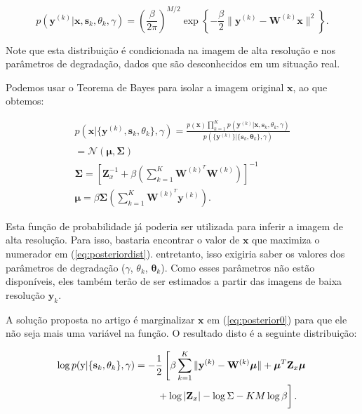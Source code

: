 \documentclass[12pt,openright,oneside,a4paper,english,brazil]{abntex2}
\begin{document}
\begin{equation}
	\label{eq:posterior0}
	p(\mathbf{y}^{(k)} | \mathbf{x}, \mathbf{s}_k, \theta_k, \gamma) = 
	\left(\frac{\beta}{2\pi}\right)^{M/2}
	\exp \left\{ -\frac{\beta}{2} \| \mathbf{y}^{(k)} - \mathbf{W}^{(k)} \mathbf{x} \|^2 \right\}.
\end{equation}

Note que esta distribuição é condicionada na imagem de alta resolução e nos parâmetros de degradação, dados que são desconhecidos em um situação real.

Podemos usar o Teorema de Bayes para isolar a imagem original $\mathbf{x}$, ao que obtemos:

\begin{gather}
	\label{eq:posteriordist}
	p(\mathbf{x}|\{\mathbf{y}^{(k)},\mathbf{s}_k,\theta_k\}, \gamma) = 
	\frac{p(\mathbf{x})\prod^K_{k=1} p(\mathbf{y}^{(k)}|\mathbf{x},\mathbf{s}_k,\theta_k, \gamma)}
	{p(\{\mathbf{y}^{(k)}\}|\{\mathbf{s}_k,\mathbf{\theta}_k\},\gamma)} \\
	= \mathcal{N}(\boldsymbol{\mu},\mathbf{\Sigma}) \\
	\mathbf{ \Sigma }= \left[\mathbf{Z}^{-1}_x + \beta \left( \sum^K_{k = 1} \mathbf{W}^{(k)^T} \mathbf{W}^{(k)} \right) \right]^{-1} \\
	\boldsymbol{\mu} = \beta \mathbf{ \Sigma } \left( \sum^K_{k=1} \mathbf{W}^{(k)^T}\mathbf{y}^{(k)} \right).
\end{gather}

Esta função de probabilidade já poderia ser utilizada para inferir a imagem de alta resolução.
Para isso, bastaria encontrar o valor de $\mathbf{x}$ que maximiza o numerador em (\ref{eq:posteriordist}). entretanto, isso exigiria saber os valores dos parâmetros de degradação ($\gamma$, $\theta_k$, $\mathbf{\theta}_k$).
Como esses parâmetros não estão disponíveis, eles também terão de ser estimados a partir das imagens de baixa resolução $\mathbf{y}_k$. 

A solução proposta no artigo é marginalizar $\mathbf{x}$ em (\ref{eq:posterior0}) para que ele não seja mais uma variável na função. O resultado disto é a seguinte distribuição:

\begin{align}
	\label{eq:parameter}
	\log p(\mathrm{y}|\{\mathbf{s}_k,\theta_k\}, \gamma) &= -\frac{1}{2}\left[\beta \sum^K_{k=1} \|\mathbf{y}^{(k)} - \mathbf{W}^{(k)}\boldsymbol{\mu}\|
    + \boldsymbol{\mu}^T\mathbf{Z}_x \boldsymbol{\mu} \right. \nonumber \\
    &\qquad \left.\vphantom{\int_t} + \log |\mathbf{Z}_x| - \log{\Sigma} - KM \log \beta \right].
\end{align}
\end{document}
